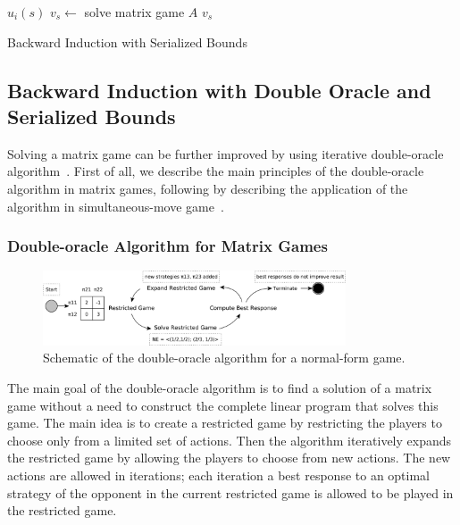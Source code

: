 \begin{algorithm2e}[t]
\small
{}
 {\Return $u_i(s)$} \label{alg:biab:stop1}
$v_s \leftarrow$ solve matrix game $A$\;
\Return $v_s$ \label{alg:biab:stop2}
\caption{Backward Induction with Serialized Bounds}\label{alg:backwardinduction-ab}
\end{algorithm2e}

\subsection{Backward Induction with Double Oracle and Serialized Bounds}\label{sec:algs:doab}
Solving a matrix game can be further improved by using iterative double-oracle algorithm~\cite{McMahan03Planning}. 
First of all, we describe the main principles of the double-oracle algorithm in matrix games, following by describing the application of the algorithm in simultaneous-move game~\cite{Bosansky13Using}.

\subsubsection{Double-oracle Algorithm for Matrix Games}\label{sec:doab}
\begin{figure}
\centering
\includegraphics[width=0.8\textwidth]{figures/DO-scheme}
\caption{Schematic of the double-oracle algorithm for a normal-form game.}\label{fig:do-scheme}
\end{figure}

The main goal of the double-oracle algorithm is to find a solution of a matrix game without a need to construct the complete linear program that solves this game. 
The main idea is to create a restricted game by restricting the players to choose only from a limited set of actions.
Then the algorithm iteratively expands the restricted game by allowing the players to choose from new actions.
The new actions are allowed in iterations; each iteration a best response to an optimal strategy of the opponent in the current restricted game is allowed to be played in the restricted game.

